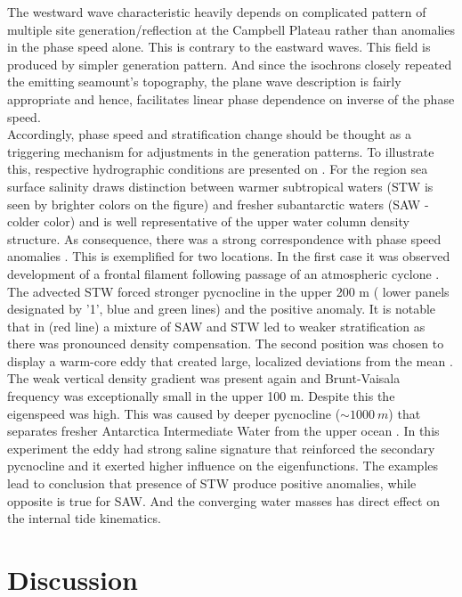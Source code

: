 \documentclass[12pt]{article}
\begin{document}
The westward wave characteristic heavily depends on complicated pattern of multiple site 
generation/reflection at the Campbell Plateau rather than anomalies in the phase speed alone. This 
is contrary to the eastward waves. This field is produced by simpler generation pattern. And 
since the isochrons closely repeated the emitting seamount's topography, the plane wave description 
is fairly appropriate and hence, facilitates linear phase dependence on inverse of the phase 
speed.\\

Accordingly, phase speed and stratification change should be thought as a triggering mechanism for 
adjustments in the generation patterns. To illustrate this, respective hydrographic conditions are 
presented on . For the region sea surface salinity draws distinction 
between warmer 
subtropical waters (STW is seen by brighter colors on the figure) and fresher subantarctic waters 
(SAW - colder color) and is well representative of the upper water column density structure. As 
consequence, there was a strong correspondence with phase speed anomalies 
. This is exemplified for two locations. In the 
first case it was observed development of a frontal filament following passage of an atmospheric 
cyclone . The advected STW forced stronger pycnocline in the 
upper 
200 m ( lower panels designated by '1', blue and green lines) and the 
positive anomaly. It is notable that in  (red line) a mixture of SAW and STW led to 
weaker stratification as there was pronounced density compensation. The second position was chosen 
to display a warm-core eddy that created large, localized deviations from the mean 
. The weak vertical density gradient was present again and 
Brunt-Vaisala frequency was exceptionally small in the upper 100 m. Despite this the eigenspeed was 
high. This was caused by deeper pycnocline ($\sim 1000~m$) that separates fresher Antarctica 
Intermediate Water from the upper ocean \citep{chiswell2015physical}. In this experiment the eddy 
had strong saline signature that reinforced the secondary pycnocline and it exerted higher 
influence on the eigenfunctions. The examples lead to conclusion that presence of STW produce 
positive anomalies, while opposite is true for SAW. And the converging water masses has direct 
effect on the internal tide kinematics.

\section{Discussion}
\label{C3.sec:disc}
\end{document}
